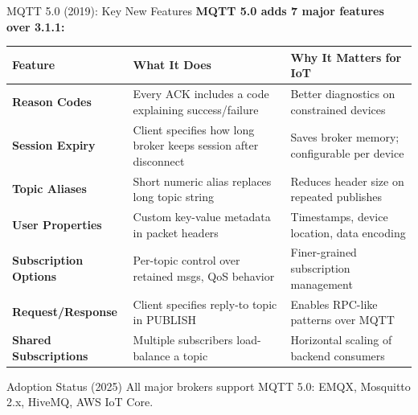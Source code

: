 \documentclass[aspectratio=169,11pt]{beamer}
\begin{document}
\begin{frame}{MQTT 5.0 (2019): Key New Features}
    \textbf{MQTT 5.0 adds 7 major features over 3.1.1:}
    
    \vspace{0.2cm}
    \footnotesize
    \begin{center}
    \begin{tabular}{p{3.5cm}p{4.5cm}p{4cm}}
        \toprule
        \textbf{Feature} & \textbf{What It Does} & \textbf{Why It Matters for IoT} \\
        \midrule
        \textbf{Reason Codes} & Every ACK includes a code explaining success/failure & Better diagnostics on constrained devices \\
        \addlinespace
        \textbf{Session Expiry} & Client specifies how long broker keeps session after disconnect & Saves broker memory; configurable per device \\
        \addlinespace
        \textbf{Topic Aliases} & Short numeric alias replaces long topic string & Reduces header size on repeated publishes \\
        \addlinespace
        \textbf{User Properties} & Custom key-value metadata in packet headers & Timestamps, device location, data encoding \\
        \addlinespace
        \textbf{Subscription Options} & Per-topic control over retained msgs, QoS behavior & Finer-grained subscription management \\
        \addlinespace
        \textbf{Request/Response} & Client specifies reply-to topic in PUBLISH & Enables RPC-like patterns over MQTT \\
        \addlinespace
        \textbf{Shared Subscriptions} & Multiple subscribers load-balance a topic & Horizontal scaling of backend consumers \\
        \bottomrule
    \end{tabular}
    \end{center}
    \normalsize
    
    \vspace{0.1cm}
    \begin{alertblock}{Adoption Status (2025)}
        All major brokers support MQTT 5.0: EMQX, Mosquitto 2.x, HiveMQ, AWS IoT Core.
    \end{alertblock}
\end{frame}
\end{document}
